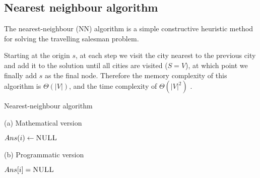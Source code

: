 \subsection{Nearest neighbour algorithm} \label{algorithm-tsp-nn}
The nearest-neighbour (NN) algorithm is a simple \gls{constructive} heuristic method for solving the travelling salesman problem.\par
Starting at the origin $s$, at each step we visit the city nearest to the previous city and add it to the solution until all cities are visited ($S = V$), at which point we finally add $s$ as the final node.
Therefore the memory complexity of this algorithm is $\Theta (|V|)$, and the time complexity of $\Theta (|V|^{2})$ \cite{reinelt}.
\begin{algorithm}[ht]
    \caption{Nearest-neighbour algorithm}
    \label{alg:nearest neighbour}
    \begin{minipage}[t]{0.49\linewidth}
        (a) Mathematical version
        \begin{algorithmic}[1]
                 {$Ans(i) \gets \textsc{NULL}$}
                \EndFor
                \EndFor
                \State {}
            \EndFunction
        \end{algorithmic}
    \end{minipage}
    \begin{minipage}[t]{0.49\linewidth}
        (b) Programmatic version
        \begin{algorithmic}[1]
                 {$Ans[i] = \textsc{NULL}$}
                \EndFor
                        \EndIf
                    \EndFor
                \EndFor
                \State {}
            \EndFunction
        \end{algorithmic}
    \end{minipage}
\end{algorithm}

